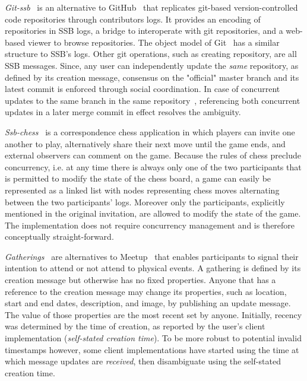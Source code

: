 \documentclass[9pt,sigconf,rewiew]{acmart}
\begin{document}
\textit{Git-ssb}~\cite{git-ssb} is an alternative to GitHub~\cite{github} that
replicates git-based version-controlled code repositories through contributors
logs. It provides an encoding of repositories in SSB logs, a bridge to
interoperate with git repositories, and a web-based viewer to browse
repositories. The object model of Git~\cite{chacon2014pro} has a similar
structure to SSB's logs. Other git operations, such as creating repository, are
all SSB messages. Since, any user can independently update the \textit{same} repository, as defined by its creation message, consensus on the "official" master branch and its latest commit is enforced
through social coordination. In case of concurrent updates to the same branch
in the same repository~\cite{git-ssb-push-conflict}, referencing both concurrent
updates in a later merge commit in effect resolves
the ambiguity.

\textit{Ssb-chess}~\cite{ssb-chess} is a correspondence chess application in
which players can invite one another to play, alternatively share their next
move until the game ends, and external observers can comment on the game.
Because the rules of chess preclude concurrency,  i.e. at any time there is always
 only one of the two participants that is permitted to modify the state of the chess board,
 a game can easily be represented as a linked list with nodes
representing chess moves alternating between the two participants' logs.
Moreover only the participants, explicitly mentioned in the original invitation, are
allowed to modify the state of the game. The implementation does not require
concurrency management and is therefore conceptually straight-forward.

\textit{Gatherings}~\cite{patch-gatherings} are alternatives to
Meetup~\cite{meetup.com} that enables participants to signal their intention to
attend or not attend to physical events. A gathering is defined by its creation message
but otherwise has no fixed properties. Anyone that has a reference to the creation message may
change its properties, such as location, start and end dates, description, and
image, by publishing an update message. The value of those properties are the
most recent set by anyone. Initially, recency was determined by the time of
creation, as reported by the user's client implementation (\textit{self-stated
creation time}). To be more robust to potential invalid
timestamps however, some client implementations have started using the time at
which message updates are \textit{received}, then disambiguate using the
self-stated creation time.
\end{document}
